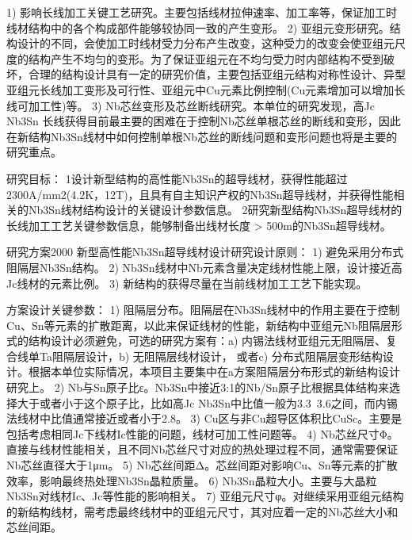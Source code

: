 \documentclass[12pt, a4paper]{ctexbook}
\begin{document}
1) 影响长线加工关键工艺研究。主要包括线材拉伸速率、加工率等，保证加工时线材结构中的各个构成部件能够较协同一致的产生变形。
2) 亚组元变形研究。结构设计的不同，会使加工时线材受力分布产生改变，这种受力的改变会使亚组元尺度的结构产生不均匀的变形。为了保证亚组元在不均匀受力时内部结构不受到破坏，合理的结构设计具有一定的研究价值，主要包括亚组元结构对称性设计、异型亚组元长线加工变形及可行性、亚组元中Cu元素比例控制(Cu元素增加可以增加长线可加工性)等。
3) Nb芯丝变形及芯丝断线研究。本单位的研究发现，高Jc Nb3Sn 长线获得目前最主要的困难在于控制Nb芯丝单根芯丝的断线和变形，因此在新结构Nb3Sn线材中如何控制单根Nb芯丝的断线问题和变形问题也将是主要的研究重点。

研究目标：
1设计新型结构的高性能Nb3Sn的超导线材，获得性能超过2300A/mm2(4.2K，12T)，且具有自主知识产权的Nb3Sn超导线材，并获得性能相关的Nb3Sn线材结构设计的关键设计参数信息。
2研究新型结构Nb3Sn超导线材的长线加工工艺关键参数信息，能够制备出线材长度 > 500m的Nb3Sn超导线材。


研究方案2000
新型高性能Nb3Sn超导线材设计研究设计原则：
1) 避免采用分布式阻隔层Nb3Sn结构。
2) Nb3Sn线材中Nb元素含量决定线材性能上限，设计接近高Jc线材的元素比例。
3) 新结构的获得尽量在当前线材加工工艺下能实现。

方案设计关键参数：
1) 阻隔层分布。阻隔层在Nb3Sn线材中的作用主要在于控制Cu、Sn等元素的扩散距离，以此来保证线材的性能，新结构中亚组元Nb阻隔层形式的结构设计必须避免，可选的研究方案有：a) 内锡法线材亚组元无阻隔层、复合线单Ta阻隔层设计，b) 无阻隔层线材设计， 或者c) 分布式阻隔层变形结构设计。根据本单位实际情况，本项目主要集中在a方案阻隔层分布形式的新结构设计研究上。
2) Nb与Sn原子比ε。Nb3Sn中接近3:1的Nb/Sn原子比根据具体结构来选择大于或者小于这个原子比，比如高Jc Nb3Sn中比值一般为3.3~3.6之间，而内锡法线材中比值通常接近或者小于2.8。
3) Cu区与非Cu超导区体积比CuSc。主要是包括考虑相同Jc下线材Ic性能的问题，线材可加工性问题等。
4) Nb芯丝尺寸Φ。直接与线材性能相关，且不同Nb芯丝尺寸对应的热处理过程不同，通常需要保证Nb芯丝直径大于1μm。
5) Nb芯丝间距Δ。芯丝间距对影响Cu、Sn等元素的扩散效率，影响最终热处理Nb3Sn晶粒质量。
6) Nb3Sn晶粒大小。主要与大晶粒Nb3Sn对线材Ic、Jc等性能的影响相关。
7) 亚组元尺寸φ。对继续采用亚组元结构的新结构线材，需考虑最终线材中的亚组元尺寸，其对应着一定的Nb芯丝大小和芯丝间距。
\end{document}
